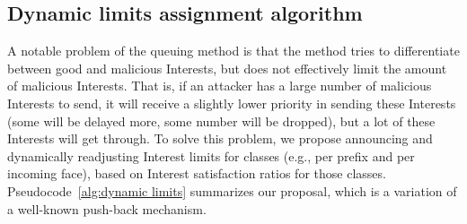 
\subsection{Dynamic limits assignment algorithm}
\label{sec:dynamic limits}

A notable problem of the queuing method is that the method tries to differentiate between good and malicious Interests, but does not effectively limit the amount of malicious Interests.
That is, if an attacker has a large number of malicious Interests to send, it will receive a slightly lower priority in sending these Interests (some will be delayed more, some number will be dropped), but a lot of these Interests will get through.
To solve this problem, we propose announcing and dynamically readjusting Interest limits for classes (e.g., per prefix and per incoming face), based on Interest satisfaction ratios for those classes. 
Pseudocode~\ref{alg:dynamic limits} summarizes our proposal, which is a variation of a well-known push-back mechanism.




